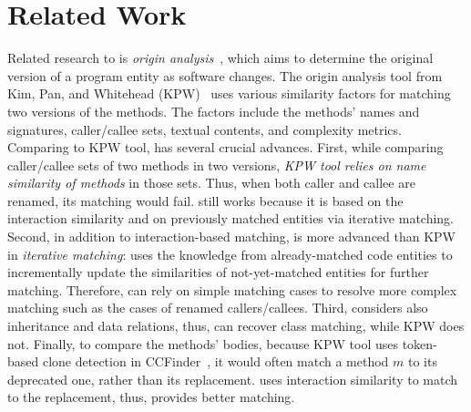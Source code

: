 \section{Related Work}

\vspace{0.05in}
 Related research to {\tool} is {\em
origin analysis}~\cite{godfrey02,sungkim-wcre05,godfrey05}, which aims
to determine the original version of a program entity as software
changes. The origin analysis tool from Kim, Pan, and Whitehead
(KPW)~\cite{sungkim-wcre05} uses various similarity factors for
matching two versions of the methods. The factors include the methods'
names and signatures, caller/callee sets, textual contents, and
complexity metrics. Comparing to KPW tool, {\tool} has several crucial
advances. First, while comparing caller/callee sets of two methods in
two versions, {\em KPW tool relies on name similarity of methods} in
those sets. Thus, when both caller and callee are renamed, its
matching would fail. {\tool} still works because it is based on the
interaction similarity and on previously matched entities via
iterative matching. Second, in addition to interaction-based matching,
{\tool} is more advanced than KPW in {\em iterative matching}: {\tool}
uses the knowledge from already-matched code entities to incrementally
update the similarities of not-yet-matched entities for further
matching. Therefore, {\tool} can rely on simple matching cases to
resolve more complex matching such as the cases of renamed
callers/callees. Third, {\tool} considers also inheritance and data
relations, thus, can recover class matching, while KPW does not.
Finally, to compare the methods' bodies, because KPW tool uses
token-based clone detection in CCFinder~\cite{ccfinder}, it would
often match a method $m$ to its deprecated one, rather than its
replacement. {\tool} uses interaction similarity to match to the
replacement, thus, provides better matching.



